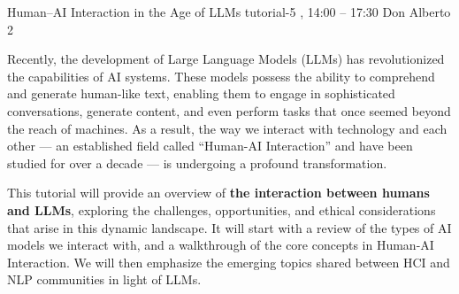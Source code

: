 %

\clearpage
\begin{tutorial}
  {Human--AI Interaction in the Age of LLMs}
  {tutorial-5}
  {\daydateyear, 14:00 -- 17:30}
  {Don Alberto 2}

Recently, the development of Large Language Models (LLMs) has revolutionized the capabilities of AI systems. These models possess the ability to comprehend and generate human-like text, enabling them to engage in sophisticated conversations, generate content, and even perform tasks that once seemed beyond the reach of machines. As a result, the way we interact with technology and each other --- an established field called ``Human-AI Interaction'' and have been studied for over a decade --- is undergoing a profound transformation.

This tutorial will provide an overview of \textbf{the interaction between humans and LLMs}, exploring the challenges, opportunities, and ethical considerations that arise in this dynamic landscape. It will start with a review of the types of AI models we interact with, and a walkthrough of the core concepts in Human-AI Interaction. We will then emphasize the emerging topics shared between HCI and NLP communities in light of LLMs.

\end{tutorial}
